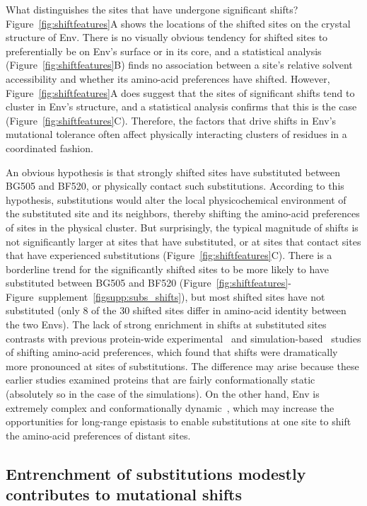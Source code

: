 \documentclass[9pt]{elife}
\begin{document}
What distinguishes the sites that have undergone significant shifts?
Figure~\ref{fig:shiftfeatures}A shows the locations of the shifted sites on the crystal structure of Env.
There is no visually obvious tendency for shifted sites to preferentially be on Env's surface or in its core, and a statistical analysis (Figure~\ref{fig:shiftfeatures}B) finds no association between a site's relative solvent accessibility and whether its amino-acid preferences have shifted.
However, Figure~\ref{fig:shiftfeatures}A does suggest that the sites of significant shifts tend to cluster in Env's structure, and a statistical analysis confirms that this is the case (Figure~\ref{fig:shiftfeatures}C).
Therefore, the factors that drive shifts in Env's mutational tolerance often affect physically interacting clusters of residues in a coordinated fashion.

An obvious hypothesis is that strongly shifted sites have substituted between BG505 and BF520, or physically contact such substitutions.
According to this hypothesis, substitutions would alter the local physicochemical environment of the substituted site and its neighbors, thereby shifting the amino-acid preferences of sites in the physical cluster.
But surprisingly, the typical magnitude of shifts is not significantly larger at sites that have substituted, or at sites that contact sites that have experienced substitutions (Figure~\ref{fig:shiftfeatures}C).
There is a borderline trend for the significantly shifted sites to be more likely to have substituted between BG505 and BF520 (Figure~\ref{fig:shiftfeatures}-Figure~supplement~\ref{figsupp:subs_shifts}), but most shifted sites have not substituted (only 8 of the 30 shifted sites differ in amino-acid identity between the two Envs).
The lack of strong enrichment in shifts at substituted sites contrasts with previous protein-wide experimental~\citep{doud2015site} and simulation-based~\citep{pollock2012amino,shah2015contingency} studies of shifting amino-acid preferences, which found that shifts were dramatically more pronounced at sites of substitutions.
The difference may arise because these earlier studies examined proteins that are fairly conformationally static (absolutely so in the case of the simulations).
On the other hand, Env is extremely complex and conformationally dynamic~\citep{munro2014conformational,ozorowski2017open}, which may increase the opportunities for long-range epistasis to enable substitutions at one site to shift the amino-acid preferences of distant sites.

\subsection{Entrenchment of substitutions modestly contributes to mutational shifts}
\end{document}
